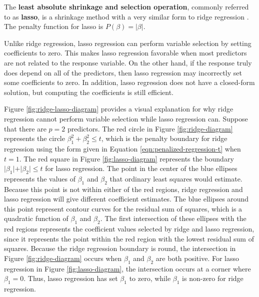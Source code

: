 \documentclass{article}
\begin{document}
The \textbf{least absolute shrinkage and selection operation}, commonly referred to as \textbf{lasso}, is a shrinkage method with a very similar form to ridge regression \cite{tibshirani1996regression, james2013introduction}. The penalty function for lasso is $P(\beta) = \vert \beta \vert$.

Unlike ridge regression, lasso regression can perform variable selection by setting coefficients to zero. This makes lasso regression favorable when most predictors are not related to the response variable. On the other hand, if the response truly does depend on all of the predictors, then lasso regression may incorrectly set some coefficients to zero. In addition, lasso regression does not have a closed-form solution, but computing the coefficients is still efficient.

Figure \ref{fig:ridge-lasso-diagram} provides a visual explanation for why ridge regression cannot perform variable selection while lasso regression can. Suppose that there are $p = 2$ predictors. The red circle in Figure \ref{fig:ridge-diagram} represents the circle $\beta_1^2 + \beta_2^2 \leq t$, which is the penalty boundary for ridge regression using the form given in Equation \ref{eqn:penalized-regression-t} when $t = 1$. The red square in Figure \ref{fig:lasso-diagram} represents the boundary $\vert \beta_1 \vert + \vert \beta_2 \vert \leq t$ for lasso regression. The point in the center of the blue ellipses represents the values of $\beta_1$ and $\beta_2$ that ordinary least squares would estimate. Because this point is not within either of the red regions, ridge regression and lasso regression will give different coefficient estimates. The blue ellipses around this point represent contour curves for the residual sum of squares, which is a quadratic function of $\beta_1$ and $\beta_2$. The first intersection of these ellipses with the red regions represents the coefficient values selected by ridge and lasso regression, since it represents the point within the red region with the lowest residual sum of squares. Because the ridge regression boundary is round, the intersection in Figure \ref{fig:ridge-diagram} occurs when $\beta_1$ and $\beta_2$ are both positive. For lasso regression in Figure \ref{fig:lasso-diagram}, the intersection occurs at a corner where $\beta_1=0$. Thus, lasso regression has set $\beta_1$ to zero, while $\beta_1$ is non-zero for ridge regression.
\end{document}
